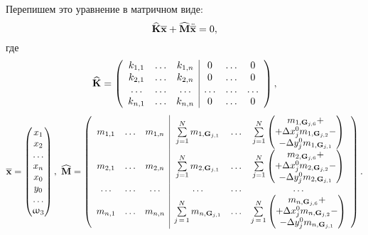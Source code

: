 Перепишем это уравнение в матричном виде:
\begin{equation}
	\widehat{\mathbf{K}} \overline{\mathbf{x}} + \widehat{\mathbf{M}} \ddot{\overline{\mathbf{x}}} = 0,
	\label{eq:motionEquationLocal}
\end{equation}
где
\begin{equation*}
\widehat{\mathbf{K}}=
\left(
\begin{array}{c c c | c c c}
k_{1,1} & \hdots & k_{1,n} & 0 & \hdots & 0 \\
k_{2,1} & \hdots & k_{2,n} & 0 & \hdots & 0 \\
\hdots & \hdots & \hdots & \hdots & \hdots & \hdots \\
k_{n,1} & \hdots & k_{n,n} & 0 & \hdots & 0 \\
\end{array}
\right),
\end{equation*}
\begin{equation*}
\overline{\mathbf{x}} =
\begin{pmatrix}
	x_1 \\
	x_2 \\
	\hdots \\
	x_n \\
	x_0 \\
	y_0 \\
	\hdots \\
	\upomega_3
\end{pmatrix}, \
\widehat{\mathbf{M}}=
\left(
\begin{array}{c c c | c c c}
m_{1,1} & \hdots & m_{1,n} &
\sum\limits_{j=1}^N m_{1, \mathbf{G}_{j, 1}} & \hdots
&
\sum\limits_{j=1}^N
\begin{pmatrix}
m_{1,\mathbf{G}_{j,6}} + \\
+ \Delta x_j^0 m_{1, \mathbf{G}_{j,2}} - \\
- \Delta y_j^0 m_{1, \mathbf{G}_{j,1}} \\
\end{pmatrix} \\

m_{2,1} & \hdots & m_{2,n} &
\sum\limits_{j=1}^N m_{2, \mathbf{G}_{j, 1}} & \hdots
&
\sum\limits_{j=1}^N
\begin{pmatrix}
	m_{2,\mathbf{G}_{j,6}} + \\
	+ \Delta x_j^0 m_{2, \mathbf{G}_{j,2}} - \\
	- \Delta y_j^0 m_{2, \mathbf{G}_{j,1}} \\
\end{pmatrix} \\

\hdots & \hdots & \hdots & \hdots & \hdots & \hdots \\

m_{n,1} & \hdots & m_{n,n} 
&
\sum\limits_{j\,=\,1} ^ N m_{n, \mathbf{G}_{j, 1}} 
& 
\hdots
&
\sum\limits_{j\,=\,1} ^ N
\begin{pmatrix}
	m_{n,\mathbf{G}_{j,6}} + \\
	+ \Delta x_j^0 m_{n, \mathbf{G}_{j,2}} - \\
	- \Delta y_j^0 m_{n, \mathbf{G}_{j,1}} \\
\end{pmatrix} \\
\end{array}
\right).
\end{equation*}
